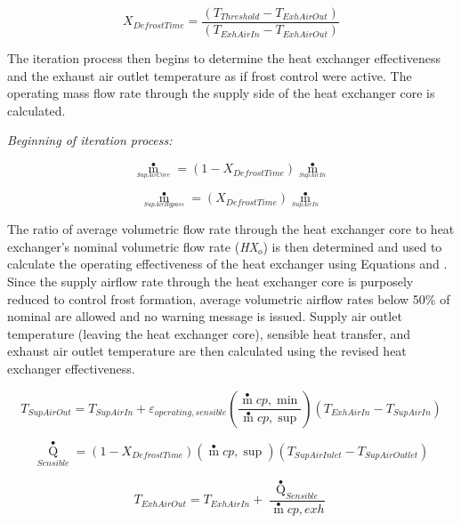 \begin{equation}
{X_{DefrostTime}} = \frac{{({T_{Threshold}} - {T_{ExhAirOut}})}}{{({T_{ExhAirIn}} - {T_{ExhAirOut}})}}
\end{equation}

The iteration process then begins to determine the heat exchanger effectiveness and the exhaust air outlet temperature as if frost control were active. The operating mass flow rate through the supply side of the heat exchanger core is calculated.

\emph{Beginning of iteration process:}

\begin{equation}
{\mathop m\limits^ \bullet_{_{SupAirCore}}} = (1 - {X_{DefrostTime}}){\mathop m\limits^ \bullet_{_{SupAirIn}}}
\end{equation}

\begin{equation}
{\mathop m\limits^ \bullet_{_{SupAirBypass}}} = ({X_{DefrostTime}}){\mathop m\limits^ \bullet_{_{SupAirIn}}}
\end{equation}

The ratio of average volumetric flow rate through the heat exchanger core to heat exchanger's nominal volumetric flow rate (\emph{HX\(_{o}\)}) is then determined and used to calculate the operating effectiveness of the heat exchanger using Equations and . Since the supply airflow rate through the heat exchanger core is purposely reduced to control frost formation, average volumetric airflow rates below 50\% of nominal are allowed and no warning message is issued. Supply air outlet temperature (leaving the heat exchanger core), sensible heat transfer, and exhaust air outlet temperature are then calculated using the revised heat exchanger effectiveness.

\begin{equation}
{T_{SupAirOut}} = {T_{SupAirIn}} + {\varepsilon_{operating,sensible}}\left( {\frac{{\mathop m\limits^ \bullet  cp,\min }}{{\mathop m\limits^ \bullet  cp,\sup }}} \right)({T_{ExhAirIn}} - {T_{SupAirIn}})
\end{equation}

\begin{equation}
{\mathop Q\limits^ \bullet_{Sensible}} = (1 - {X_{DefrostTime}})\left( {\mathop m\limits^ \bullet  cp,\sup } \right)({T_{SupAirInlet}} - {T_{SupAirOutlet}})
\end{equation}

\begin{equation}
{T_{ExhAirOut}} = {T_{ExhAirIn}} + \frac{{{{\mathop Q\limits^ \bullet  }_{Sensible}}}}{{\mathop m\limits^ \bullet  cp,exh}}
\end{equation}

